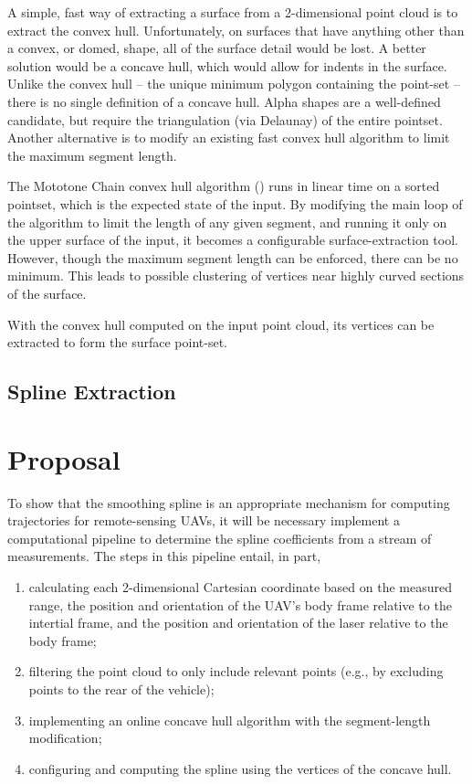 \documentclass[doc]{apa6}
\begin{document}
A simple, fast way of extracting a surface from a 2-dimensional point cloud is to extract the convex hull. Unfortunately, on surfaces that have anything other than a convex, or domed, shape, all of the surface detail would be lost. A better solution would be a concave hull, which would allow for indents in the surface. Unlike the convex hull -- the unique minimum polygon containing the point-set -- there is no single definition of a concave hull. Alpha shapes \cite{Edelsbrunner1994} are a well-defined candidate, but require the triangulation (via Delaunay) of the entire pointset. Another alternative is to modify an existing fast convex hull algorithm to limit the maximum segment length.

The Mototone Chain convex hull algorithm (\cite{Andrew1979}) runs in linear time on a sorted pointset, which is the expected state of the input. By modifying the main loop of the algorithm to limit the length of any given segment, and running it only on the upper surface of the input, it becomes a configurable surface-extraction tool. However, though the maximum segment length can be enforced, there can be no minimum. This leads to possible clustering of vertices near highly curved sections of the surface.

With the convex hull computed on the input point cloud, its vertices can be extracted to form the surface point-set.

\subsection{Spline Extraction}




\section{Proposal}

To show that the smoothing spline is an appropriate mechanism for computing trajectories for remote-sensing UAVs, it will be necessary implement a computational pipeline to determine the spline coefficients from a stream of measurements. The steps in this pipeline entail, in part,

\begin{enumerate}
\item calculating each 2-dimensional Cartesian coordinate based on the measured range, the position and  orientation of the UAV's body frame relative to the intertial frame, and the position and orientation of the laser relative to the body frame;
\item filtering the point cloud to only include relevant points (e.g., by excluding points to the rear of the vehicle);
\item implementing an online concave hull algorithm with the segment-length modification;
\item configuring and computing the spline using the vertices of the concave hull.
\end{enumerate}
\end{document}
